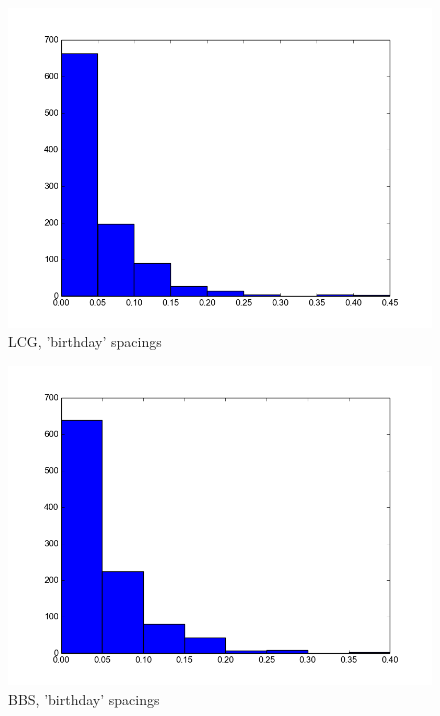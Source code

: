 \documentclass[reprint,aip]{revtex4-1}
\begin{document}
\begin{figure}[h]
\includegraphics{bday-lcg.png}
\caption{LCG, 'birthday' spacings}
\end{figure}

\begin{figure}[h]
\includegraphics{bday-bbs.png}
\caption{BBS, 'birthday' spacings}
\end{figure}
\end{document}
